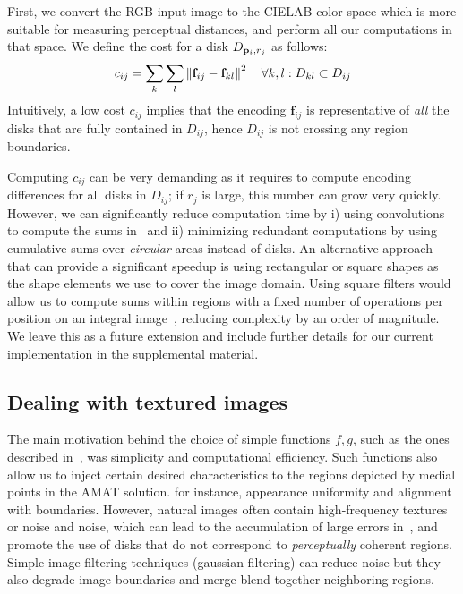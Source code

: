 \documentclass[10pt,twocolumn,letterpaper]{article}
\begin{document}
First, we convert the RGB input image to the CIELAB color space which is more suitable for measuring perceptual distances,
and perform all our computations in that space.
We define the cost for a disk $D_{\mathbf{p}_{i},r_j}$ as follows:
\begin{equation}
c_{ij} = \sum_k \sum_l \left \lVert \mathbf{f}_{ij} - \mathbf{f}_{kl}  \right \rVert^2 \quad \forall k,l: D_{kl} \subset D_{ij}
\label{eq:diskcost}
\end{equation}
Intuitively, a low cost $c_{ij}$ implies that the encoding $\mathbf{f}_{ij}$ is representative of \emph{all}
the disks that are fully contained in $D_{ij}$, hence $D_{ij}$ is not crossing any region boundaries.

Computing $c_{ij}$ can be very demanding as it requires to compute encoding differences for all 
disks in $D_{ij}$; if $r_j$ is large, this number can grow very quickly.
However, we can significantly reduce computation time by i) using convolutions to compute the sums in~
and ii) minimizing redundant computations by using cumulative sums over \emph{circular} areas instead of disks.
An alternative approach that can provide a significant speedup is using rectangular or square shapes as the
shape elements we use to cover the image domain.
Using square filters would allow us to compute sums within regions with a fixed number of operations per position on an integral
image~\cite{viola2001rapid,arbelaez2011contour}, reducing complexity by an order of magnitude.
We leave this as a future extension and include further details for our current implementation in the supplemental material.


\subsection{Dealing with textured images}\label{sec:method:texture}
The main motivation behind the choice of simple functions $f,g$, such as the ones described in~, was simplicity and 
computational efficiency.
Such functions also allow us to inject certain desired characteristics to the regions depicted by medial points in the AMAT solution.
for instance, appearance uniformity and alignment with boundaries.
However, natural images often contain high-frequency textures or noise and noise, which can lead to the accumulation of large errors 
in~, and promote the use of disks that do not correspond to \emph{perceptually} coherent regions. 
Simple image filtering techniques (\eg gaussian filtering) can reduce noise but they also degrade image boundaries and
merge blend together neighboring regions.
\end{document}
